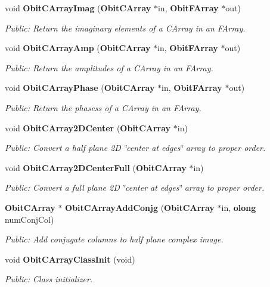 \begin{CompactItemize}
void {\bf Obit\-CArray\-Imag} ({\bf Obit\-CArray} $\ast$in, {\bf Obit\-FArray} $\ast$out)
\begin{CompactList}\small\item\em Public: Return the imaginary elements of a CArray in an FArray. \item\end{CompactList}\item 
void {\bf Obit\-CArray\-Amp} ({\bf Obit\-CArray} $\ast$in, {\bf Obit\-FArray} $\ast$out)
\begin{CompactList}\small\item\em Public: Return the amplitudes of a CArray in an FArray. \item\end{CompactList}\item 
void {\bf Obit\-CArray\-Phase} ({\bf Obit\-CArray} $\ast$in, {\bf Obit\-FArray} $\ast$out)
\begin{CompactList}\small\item\em Public: Return the phasess of a CArray in an FArray. \item\end{CompactList}\item 
void {\bf Obit\-CArray2DCenter} ({\bf Obit\-CArray} $\ast$in)
\begin{CompactList}\small\item\em Public: Convert a half plane 2D \char`\"{}center at edges\char`\"{} array to proper order. \item\end{CompactList}\item 
void {\bf Obit\-CArray2DCenter\-Full} ({\bf Obit\-CArray} $\ast$in)
\begin{CompactList}\small\item\em Public: Convert a full plane 2D \char`\"{}center at edges\char`\"{} array to proper order. \item\end{CompactList}\item 
{\bf Obit\-CArray} $\ast$ {\bf Obit\-CArray\-Add\-Conjg} ({\bf Obit\-CArray} $\ast$in, {\bf olong} num\-Conj\-Col)
\begin{CompactList}\small\item\em Public: Add conjugate columns to half plane complex image. \item\end{CompactList}\item 
void {\bf Obit\-CArray\-Class\-Init} (void)
\begin{CompactList}\small\item\em Public: Class initializer. \item\end{CompactList}\end{CompactItemize}


